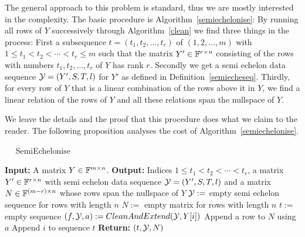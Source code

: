 The general approach to this problem is standard, thus we are mostly
interested in the complexity. The basic procedure is
Algorithm~\ref{semiechelonise}: By running
all rows of $Y$ successively through Algorithm~\ref{clean} we
find three things in the process: First a subsequence
$t=(t_1,t_2, \ldots, t_{r})$ of $(1,2,\ldots, m)$ with
$1 \le t_1 < t_2 < \cdots < t_r \le m$ such that the matrix
$Y' \in \mathbb{F}^{r \times n}$ consisting of the rows with numbers 
$t_1, t_2, \ldots, t_r$ of $Y$ has rank $r$. Secondly we get a
semi echelon data sequence $\mathcal{Y} = (Y',S,T,l)$ for $Y'$ as defined
in Definition~\ref{semiecheseq}. Thirdly, for every row of $Y$ that
is a linear combination of the rows above it in $Y$, we find a linear 
relation of the rows of $Y$ and all these relations span the nullspace
of $Y$.

We leave the details and the proof that this procedure does what
we claim to the reader. The following proposition analyses the cost
of Algorithm~\ref{semiechelonise}.

\begin{algorithm}
\caption{$\quad$ \sc SemiEchelonise}
%
\label{semiechelonise}
\begin{algorithmic}
\STATE \textbf{Input:} A matrix $Y \in \mathbb{F}^{m \times n}$.
\STATE \textbf{Output:} Indices $1 \le t_1 < t_2 < \cdots < t_r$,
a matrix $Y' \in \mathbb{F}^{r \times n}$ with semi echelon data sequence
\STATE \mbox{}
$\mathcal{Y} = (Y',S,T,l)$ and a matrix $N \in \mathbb{F}^{(m-r) \times n}$
whose rows span the nullspace of $Y$
\STATE $\mathcal{Y} := $ empty semi echelon sequence for rows with length $n$
\STATE $N := $ empty matrix for rows with length $n$
\STATE $t := $ empty sequence
    \STATE $(f,\calY,a) := \textsc{CleanAndExtend}(\calY,Y[i])$
        \STATE Append a row to $N$ using $a$
    \ELSE
        \STATE Append $i$ to sequence $t$
    \ENDIF
\ENDFOR
\STATE \textbf{Return:} $(t,\mathcal{Y},N)$
\end{algorithmic}
\end{algorithm}

